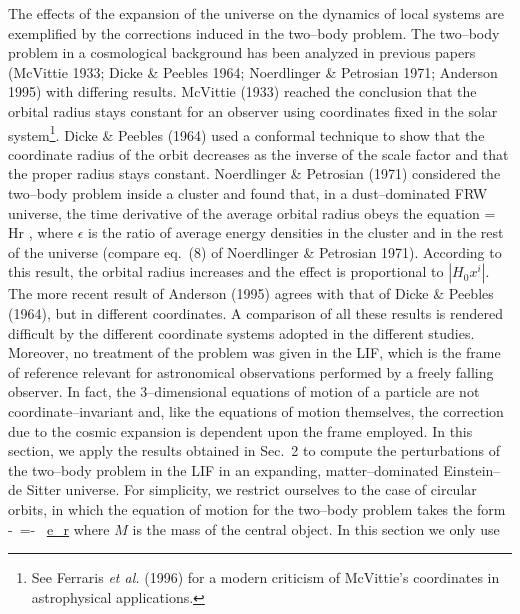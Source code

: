   The effects of the expansion of the universe on the dynamics of local systems
  are exemplified by the corrections induced in the two--body problem. 
  The two--body problem in a cosmological background has been
  analyzed  in previous papers (McVittie 1933; Dicke \& Peebles 1964; 
  Noerdlinger \& Petrosian
  1971; Anderson 1995) with differing results. McVittie (1933) reached the
  conclusion that the orbital radius stays constant for an observer using
  coordinates fixed in the solar system\footnote{See Ferraris {\em et al.}
(1996) 
  for a modern criticism of McVittie's coordinates in astrophysical
  applications.}. Dicke \& Peebles (1964) used a
  conformal technique to show that the coordinate radius of the orbit
decreases as the
  inverse of the scale factor and that the proper radius stays constant. 
  Noerdlinger \& Petrosian (1971) considered the
  two--body problem inside a cluster and found that, in a
  dust--dominated FRW universe, the time derivative of the average orbital
  radius obeys the equation \setcounter{equation}{0}
\be \label{41}
  = \, H\langle r
  \rangle \; ,
\ee
where $\epsilon$ is the ratio of average energy densities in the cluster 
and in the rest of the universe (compare eq.~(8) of Noerdlinger \&
Petrosian 1971).  According to this result, the orbital radius increases
and the effect is proportional to $\left| H_0 x^i\right|$. The more recent
result of Anderson (1995) agrees with that of Dicke \& Peebles (1964), but
in different coordinates. A comparison of all these results is rendered
difficult by the
  different coordinate systems adopted in the different studies. Moreover, 
  no treatment of the problem was given in the LIF, which is the 
  frame of reference relevant for astronomical observations performed by a 
  freely falling observer. In fact, the 3--dimensional
  equations of motion of a particle are not coordinate--invariant
  and, like the equations of motion themselves, the
  correction due to the cosmic expansion is dependent upon the frame employed. 
  In this section, we apply the
  results obtained in Sec.~2 to compute the perturbations of the two--body
  problem in the LIF in an expanding, matter--dominated Einstein--de
Sitter
universe. For simplicity, we restrict ourselves to the case of circular
orbits, in which the equation of motion for the two--body problem takes
the form
\be
{}-\, =- \,
\underline{e_r}                               \label{grav}
\ee
  where $M$ is the mass of the central object. In this section we only use

